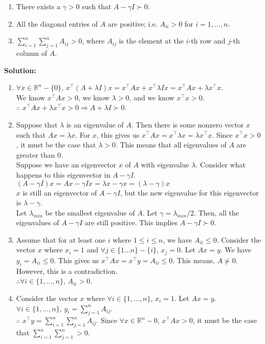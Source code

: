 \documentclass{article}
\newcommand{\solution}{\textbf{Solution: }}
\newcommand{\R}{\mathbb{R}}
\begin{document}
\begin{enumerate}[label=(\alph*)]
\begin{enumerate}[label=(\roman*)]
        \item There exists a $\gamma > 0$ such that $A - \gamma I \succ 0$. 
        \item All the diagonal entries of $A$ are positive; i.e. $A_{ii} > 0$ for $i = 1, \ldots, n$. 
        \item $\sum_{i=1}^n \sum_{j=1}^n A_{ij} > 0$, where $A_{ij}$ is the element at the $i$-th row and $j$-th column of $A$. 
    \end{enumerate}
    \begin{mdframed} \solution
    \begin{enumerate}[label=(\roman*)]
    \item $\forall x \in \R^n - \{0\}$, $x^{\top}(A+\lambda I)x=x^{\top}Ax+x^{\top}\lambda I x=x^{\top}Ax+\lambda x^{\top}x$.\\
    We know $x^{\top}Ax > 0$, we know $\lambda > 0$, and we know $x^{\top}x > 0$.\\
    $\therefore$ $x^{\top}Ax+\lambda x^{\top}x > 0 \Rightarrow A+\lambda I \succ 0$.
    \item Suppose that $\lambda$ is an eigenvalue of $A$. Then there is some nonzero vector $x$ such that $Ax=\lambda x$. For $x$, this gives us $x^{\top}Ax=x^{\top}\lambda x = \lambda x^{\top}x$. Since $x^{\top}x>0$, it must be the case that $\lambda > 0$. This means that all eigenvalues of $A$ are greater than $0$.\\
    Suppose we have an eigenvector $x$ of $A$ with eigenvalue $\lambda$. Consider what happens to this eigenvector in $A-\gamma I$.\\
    $(A-\gamma I)x = Ax - \gamma I x = \lambda x - \gamma x = (\lambda - \gamma)x$\\
    $x$ is still an eigenvector of $A - \gamma I$, but the new eigenvalue for this eigenvector is $\lambda - \gamma$.\\
    Let $\lambda_{min}$ be the smallest eigenvalue of $A$. Let $\gamma = \lambda_{min}/2$. Then, all the eigenvalues of $A - \gamma I$ are still positive. This implies $A - \gamma I \succ 0$.
    \item Assume that for at least one $i$ where $1 \leq i \leq n$, we have $A_{ii} \leq 0$. Consider the vector $x$ where $x_i=1$ and $\forall j \in \{1 \dots n\} - \{i\}$, $x_j=0$. Let $Ax=y$. We have $y_i=A_{ii} \leq 0$. This gives us $x^{\top}Ax=x^{\top}y=A_{ii} \leq 0$. This means, $A \nsucc 0$. However, this is a contradiction.\\$\therefore \forall i \in \{1, \dots, n\}$, $A_{ii} > 0$.
    \item Consider the vector $x$ where $\forall i \in \{1, \dots, n\}$, $x_i=1$. Let $Ax=y$.\\
    $\forall i \in \{1, \dots, n\}$, $y_i=\sum_{j=1}^{n}A_{ij}$.\\
    $\therefore$ $x^{\top}y=\sum_{i=1}^{n}\sum_{j=1}^{n}A_{ij}$. Since $\forall x \in \R^n - {0}$, $x^{\top}Ax > 0$, it must be the case that $\sum_{i=1}^{n}\sum_{j=1}^{n}>0$.
    \end{enumerate}
    \end{mdframed}    
\end{enumerate}
\end{document}
